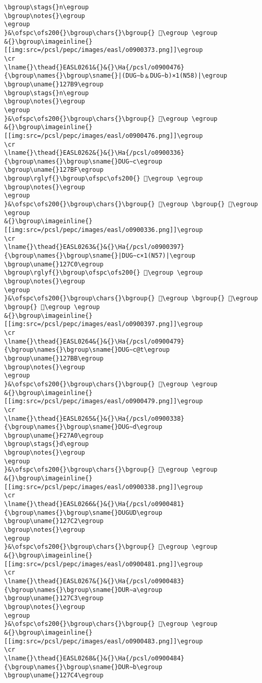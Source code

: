 \begin{verbatim}
\bgroup\stags{}n\egroup
\bgroup\notes{}\egroup
\egroup
}&\ofspc\ofs200{}\bgroup\chars{}\bgroup{} 𒞲\egroup \egroup
&{}\bgroup\imageinline{}[[img:src=/pcsl/pepc/images/easl/o0900373.png]]\egroup
\cr
\lname{}\thead{}EASL0261&{}&{}\Ha{/pcsl/o0900476}{\bgroup\names{}\bgroup\sname{}|(DUG∼b﹠DUG∼b)×1(N58)|\egroup
\bgroup\uname{}127B9\egroup
\bgroup\stags{}n\egroup
\bgroup\notes{}\egroup
\egroup
}&\ofspc\ofs200{}\bgroup\chars{}\bgroup{} 𒞹\egroup \egroup
&{}\bgroup\imageinline{}[[img:src=/pcsl/pepc/images/easl/o0900476.png]]\egroup
\cr
\lname{}\thead{}EASL0262&{}&{}\Ha{/pcsl/o0900336}{\bgroup\names{}\bgroup\sname{}DUG∼c\egroup
\bgroup\uname{}127BF\egroup
\bgroup\rglyf{}\bgroup\ofspc\ofs200{} 𒞿\egroup \egroup
\bgroup\notes{}\egroup
\egroup
}&\ofspc\ofs200{}\bgroup\chars{}\bgroup{} 𒞼\egroup \bgroup{} 𒞿\egroup \egroup
&{}\bgroup\imageinline{}[[img:src=/pcsl/pepc/images/easl/o0900336.png]]\egroup
\cr
\lname{}\thead{}EASL0263&{}&{}\Ha{/pcsl/o0900397}{\bgroup\names{}\bgroup\sname{}|DUG∼c×1(N57)|\egroup
\bgroup\uname{}127C0\egroup
\bgroup\rglyf{}\bgroup\ofspc\ofs200{} 𒟀\egroup \egroup
\bgroup\notes{}\egroup
\egroup
}&\ofspc\ofs200{}\bgroup\chars{}\bgroup{} 𒞾\egroup \bgroup{} 𒞽\egroup \bgroup{} 𒟀\egroup \egroup
&{}\bgroup\imageinline{}[[img:src=/pcsl/pepc/images/easl/o0900397.png]]\egroup
\cr
\lname{}\thead{}EASL0264&{}&{}\Ha{/pcsl/o0900479}{\bgroup\names{}\bgroup\sname{}DUG∼c@t\egroup
\bgroup\uname{}127BB\egroup
\bgroup\notes{}\egroup
\egroup
}&\ofspc\ofs200{}\bgroup\chars{}\bgroup{} 𒞻\egroup \egroup
&{}\bgroup\imageinline{}[[img:src=/pcsl/pepc/images/easl/o0900479.png]]\egroup
\cr
\lname{}\thead{}EASL0265&{}&{}\Ha{/pcsl/o0900338}{\bgroup\names{}\bgroup\sname{}DUG∼d\egroup
\bgroup\uname{}F27A0\egroup
\bgroup\stags{}d\egroup
\bgroup\notes{}\egroup
\egroup
}&\ofspc\ofs200{}\bgroup\chars{}\bgroup{} 󲞠\egroup \egroup
&{}\bgroup\imageinline{}[[img:src=/pcsl/pepc/images/easl/o0900338.png]]\egroup
\cr
\lname{}\thead{}EASL0266&{}&{}\Ha{/pcsl/o0900481}{\bgroup\names{}\bgroup\sname{}DUGUD\egroup
\bgroup\uname{}127C2\egroup
\bgroup\notes{}\egroup
\egroup
}&\ofspc\ofs200{}\bgroup\chars{}\bgroup{} 𒟂\egroup \egroup
&{}\bgroup\imageinline{}[[img:src=/pcsl/pepc/images/easl/o0900481.png]]\egroup
\cr
\lname{}\thead{}EASL0267&{}&{}\Ha{/pcsl/o0900483}{\bgroup\names{}\bgroup\sname{}DUR∼a\egroup
\bgroup\uname{}127C3\egroup
\bgroup\notes{}\egroup
\egroup
}&\ofspc\ofs200{}\bgroup\chars{}\bgroup{} 𒟃\egroup \egroup
&{}\bgroup\imageinline{}[[img:src=/pcsl/pepc/images/easl/o0900483.png]]\egroup
\cr
\lname{}\thead{}EASL0268&{}&{}\Ha{/pcsl/o0900484}{\bgroup\names{}\bgroup\sname{}DUR∼b\egroup
\bgroup\uname{}127C4\egroup

\end{verbatim}
